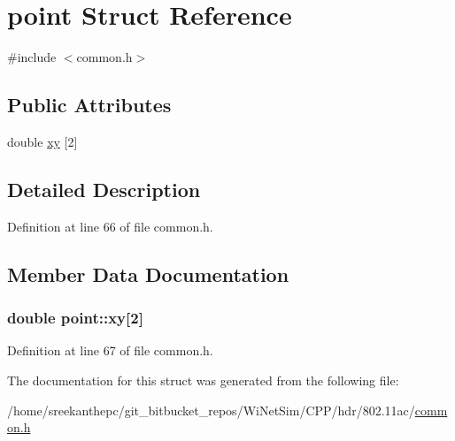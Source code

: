 \hypertarget{structpoint}{\section{point Struct Reference}
\label{structpoint}
}


{\ttfamily \#include $<$common.\-h$>$}

\subsection*{Public Attributes}
\begin{DoxyCompactItemize}
\item 
double \hyperlink{structpoint_adb40d52e9eb4f0339c8e891478822b35}{xy} \mbox{[}2\mbox{]}
\end{DoxyCompactItemize}


\subsection{Detailed Description}


Definition at line 66 of file common.\-h.



\subsection{Member Data Documentation}
\hypertarget{structpoint_adb40d52e9eb4f0339c8e891478822b35}{
\subsubsection[{xy}]{\setlength{\rightskip}{0pt plus 5cm}double point\-::xy\mbox{[}2\mbox{]}}}\label{structpoint_adb40d52e9eb4f0339c8e891478822b35}


Definition at line 67 of file common.\-h.



The documentation for this struct was generated from the following file\-:\begin{DoxyCompactItemize}
\item 
/home/sreekanthepc/git\-\_\-bitbucket\-\_\-repos/\-Wi\-Net\-Sim/\-C\-P\-P/hdr/802.\-11ac/\hyperlink{common_8h}{common.\-h}\end{DoxyCompactItemize}
